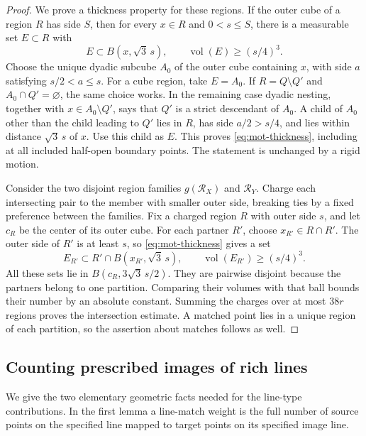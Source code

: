\begin{proof}
We prove a thickness property for these regions.  If the outer cube of a region $R$ has side $S$, then for every $x\in R$ and $0<s\le S$, there is a measurable set $E\subset R$ with
\begin{equation}
\label{eq:mot-thickness}
 E\subset B(x,\sqrt3\,s),\qquad
 \operatorname{vol}(E)\ge(s/4)^3.
\end{equation}
Choose the unique dyadic subcube $A_0$ of the outer cube containing $x$, with side $a$ satisfying $s/2<a\le s$. For a cube region, take $E=A_0$.  If $R=Q\setminus Q'$ and $A_0\cap Q'=\varnothing$, the same choice works.  In the remaining case dyadic nesting, together with $x\in A_0\setminus Q'$, says that $Q'$ is a strict descendant of $A_0$.  A child of $A_0$ other than the child leading to $Q'$ lies in $R$, has side $a/2>s/4$, and lies within distance $\sqrt3\,s$ of $x$.  Use this child as $E$.  This proves \eqref{eq:mot-thickness}, including at all included half-open boundary points.  The statement is unchanged by a rigid motion.

Consider the two disjoint region families $g(\mathcal{R}_X)$ and $\mathcal{R}_Y$.  Charge each intersecting pair to the member with smaller outer side, breaking ties by a fixed preference between the families.  Fix a charged region $R$ with outer side $s$, and let $c_R$ be the center of its outer cube.  For each partner $R'$, choose $x_{R'}\in R\cap R'$.  The outer side of $R'$ is at least $s$, so \eqref{eq:mot-thickness} gives a set
\[
 E_{R'}\subset R'\cap B(x_{R'},\sqrt3\,s),\qquad
 \operatorname{vol}(E_{R'})\ge(s/4)^3.
\]
All these sets lie in $B(c_R,3\sqrt3\,s/2)$.  They are pairwise disjoint because the partners belong to one partition. Comparing their volumes with that ball bounds their number by an absolute constant.  Summing the charges over at most $38r$ regions proves the intersection estimate.  A matched point lies in a unique region of each partition, so the assertion about matches follows as well.
\end{proof}


\FloatBarrier

\subsection{Counting prescribed images of rich lines}

We give the two elementary geometric facts needed for the line-type contributions.  In the first lemma a line-match weight is the full number of source points on the specified line mapped to target points on its specified image line.

